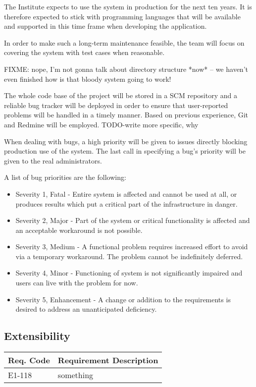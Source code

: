 \documentclass[12pt]{article}
\begin{document}
The Institute expects to use the system in production for the next ten years.
It is therefore expected to stick with programming languages that will be
available and supported in this time frame when developing the application.

In order to make such a long-term maintenance feasible, the team will focus on
covering the system with test cases when reasonable.

FIXME: nope, I'm not gonna talk about directory structure *now* -- we haven't
even finished how is that bloody system going to work!

The whole code base of the project will be stored in a SCM repository and a
reliable bug tracker will be deployed in order to ensure that user-reported
problems will be handled in a timely manner.  Based on previous experience, Git
and Redmine will be employed. TODO-write more specific, why

When dealing with bugs, a high priority will be given to issues directly
blocking production use of the system.  The last call in specifying a bug's
priority will be given to the real administrators.

A list of bug priorities are the following:
\begin{itemize}
	\item Severity 1, Fatal - Entire system is affected and cannot be used at
        all, or produces results which put a critical part of the infrastructure
        in danger.
	\item Severity 2, Major - Part of the system or critical functionality is affected and an acceptable workaround is not possible.
	\item Severity 3, Medium - A functional problem requires increased effort to avoid via a temporary workaround. The problem cannot be indefinitely deferred.
	\item Severity 4, Minor - Functioning of system is not significantly impaired and users can live with the problem for now.
	\item Severity 5, Enhancement - A change or addition to the requirements is desired to address an unanticipated deficiency.
\end{itemize}


\subsection{Extensibility}

\begin{table}[!h]
	\begin{tabular}{| l | l |}
		\hline
		\textbf{Req. Code} & \textbf{Requirement Description}\\
		\hline
		E1-118	& something\\
		\hline
	\end{tabular}
	\label{tab:ExtensibilityRequirements}
\end{table}
\end{document}
